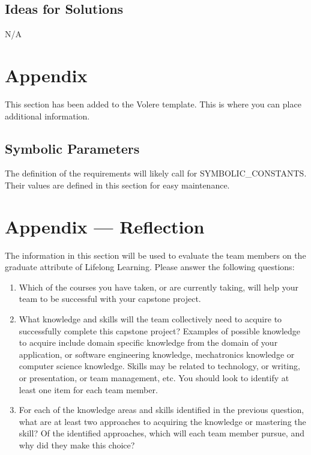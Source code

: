 \documentclass[12pt, titlepage]{article}
\begin{document}
\subsection{Ideas for Solutions}

N/A





\newpage

\section{Appendix}

This section has been added to the Volere template.  This is where you can place
additional information.

\subsection{Symbolic Parameters}

The definition of the requirements will likely call for SYMBOLIC\_CONSTANTS.
Their values are defined in this section for easy maintenance.

\section{Appendix --- Reflection}

The information in this section will be used to evaluate the team members on the
graduate attribute of Lifelong Learning.  Please answer the following questions:

\begin{enumerate}
  \item Which of the courses you have taken, or are currently taking, will help
  your team to be successful with your capstone project.
  \item What knowledge and skills will the team collectively need to acquire to
  successfully complete this capstone project?  Examples of possible knowledge
  to acquire include domain specific knowledge from the domain of your
  application, or software engineering knowledge, mechatronics knowledge or
  computer science knowledge.  Skills may be related to technology, or writing,
  or presentation, or team management, etc.  You should look to identify at
  least one item for each team member.
  \item For each of the knowledge areas and skills identified in the previous
  question, what are at least two approaches to acquiring the knowledge or
  mastering the skill?  Of the identified approaches, which will each team
  member pursue, and why did they make this choice?
\end{enumerate}
\end{document}
